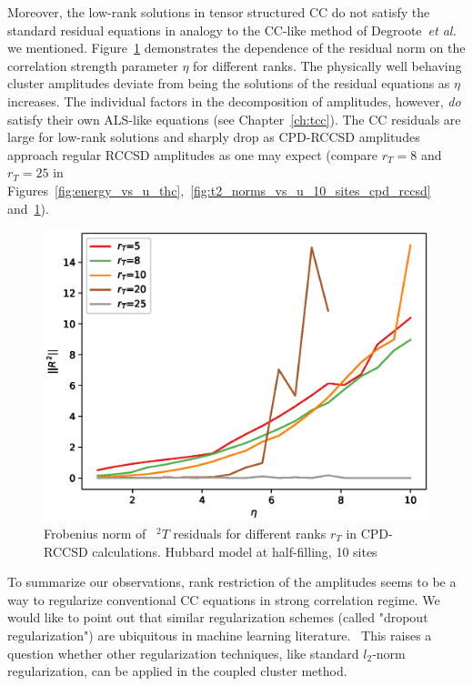 Moreover, the low-rank solutions in tensor structured CC 
do not satisfy the standard residual equations in analogy to the CC-like 
method of Degroote~\emph{et al.} we mentioned.
Figure~\ref{fig:r2_norms_vs_u_10_sites_cpd_rccsd} demonstrates the 
dependence of the residual norm on the correlation strength parameter $\eta$ 
for different ranks. The physically well behaving cluster amplitudes deviate 
from being the solutions of the residual equations as $\eta$ increases.
The individual factors in the decomposition of amplitudes, however, \emph{do} 
satisfy their own ALS-like equations (see Chapter~\ref{ch:tcc}). The CC 
residuals are large for low-rank solutions and sharply drop as 
CPD-RCCSD amplitudes approach regular RCCSD amplitudes as one may 
expect (compare $r_{T} = 8$ 
and $r_{T} = 25$ in 
Figures~\ref{fig:energy_vs_u_thc},~\ref{fig:t2_norms_vs_u_10_sites_cpd_rccsd} 
and~\ref{fig:r2_norms_vs_u_10_sites_cpd_rccsd}). 
%
\begin{figure}[ht]
\includegraphics[width=\columnwidth]
{figures/tcc_strong_correlation/r2_norms_vs_u_10_sites_cpd_rccsd}
\caption{Frobenius norm of ~${}^2T$ residuals for different ranks $r_{T}$ in 
CPD-RCCSD 
calculations. Hubbard model at half-filling, 10 sites}
\label{fig:r2_norms_vs_u_10_sites_cpd_rccsd}
\end{figure}
%
To summarize our observations, rank restriction of the 
amplitudes seems to be a way to regularize conventional CC equations 
in strong correlation regime. We would like to point out that similar 
regularization schemes (called "dropout regularization") are ubiquitous in 
machine learning literature.~\cite{srivastava2014dropout, wan2013regularization} 
This raises a question whether other regularization techniques, like 
standard $l_{2}$-norm regularization,\cite{tikhonov1963solution} can be applied 
in the coupled cluster method.

